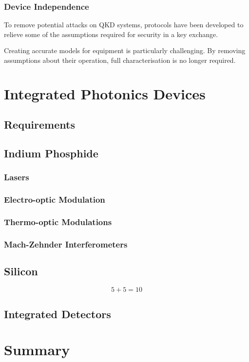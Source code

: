 \subsubsection*{Device Independence}

To remove potential attacks on \ac{QKD} systems, protocols have been developed to relieve some of the assumptions required for security in a key exchange. 

Creating accurate models for equipment is particularly challenging. By removing assumptions about their operation, full characterisation is no longer required.

\section{Integrated Photonics Devices}

\subsection{Requirements}

\subsection{Indium Phosphide}

\subsubsection*{Lasers}

\subsubsection*{Electro-optic Modulation}

\subsubsection*{Thermo-optic Modulations}

\subsubsection*{Mach-Zehnder Interferometers}

\subsection{Silicon}

\begin{equation}
	5+5=10
\end{equation}
	

\subsection{Integrated Detectors}

\section{Summary}


